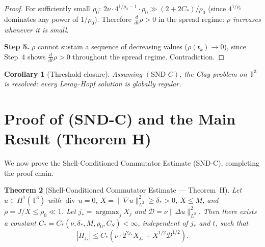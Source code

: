 \documentclass[11pt]{article}
\newtheorem{theorem}{Theorem}[section]
\newtheorem{corollary}[theorem]{Corollary}
\newcommand{\norm}[2]{\|{#1}\|_{#2}}
\newcommand{\T}{\mathbb{T}}
\newcommand{\ddt}{\tfrac{d}{dt}}
\newcommand{\DD}{\mathcal{D}}
\begin{document}
\begin{proof}
For sufficiently small $\rho_0$:
$2\nu\cdot 4^{1/\rho_0-1}\cdot\rho_0\gg(2+2C_*)/\rho_0$
(since $4^{1/\rho_0}$ dominates any power of $1/\rho_0$).
Therefore $\ddt\rho>0$ in the spread regime:
\emph{$\rho$ increases whenever it is small}.

\medskip\noindent\textbf{Step 5.}
$\rho$ cannot sustain a sequence of decreasing values
($\rho(t_k)\to0$), since Step~4 shows $\ddt\rho>0$
throughout the spread regime. Contradiction.
\end{proof}

\begin{corollary}[Threshold closure]\label{cor:threshold}
Assuming $(\mathrm{SND}\text{-}C)$, the Clay problem on $\T^3$
is resolved: every Leray--Hopf solution is globally regular.
\end{corollary}

\section{Proof of (SND-C) and the Main Result (Theorem H)}

We now prove the Shell-Conditioned Commutator Estimate (SND-C),
completing the proof chain.

\begin{theorem}[{Shell-Conditioned Commutator Estimate --- Theorem~H}]
\label{thm:H}
Let $u \in H^1(\T^3)$ with $\operatorname{div}\,u = 0$,
$X = \norm{\nabla u}{L^2}^2 \ge \delta_* > 0$, $X \le M$,
and $\rho = J/X \le \rho_0 \ll 1$.
Let $j_* = \operatorname{argmax}_j X_j$ and
$\DD = \nu\norm{\Delta u}{L^2}^2$.
Then there exists a constant
$C_* = C_*(\nu, \delta_*, M, \rho_0, C_S) < \infty$,
independent of $j_*$ and $t$, such that
\begin{equation}\label{eq:SNDC_proved}
  |\Pi_{j_*}|
  \le C_*\!\left(\nu \cdot 2^{2j_*} X_{j_*}
    + X^{1/2} \DD^{1/2}\right).
\end{equation}
\end{theorem}
\end{document}
